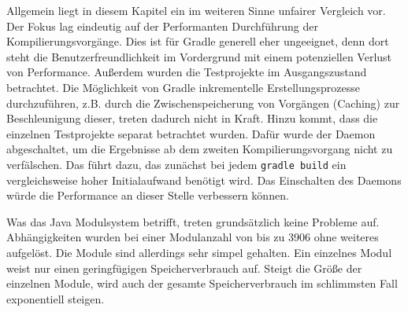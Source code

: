 Allgemein liegt in diesem Kapitel ein im weiteren Sinne unfairer Vergleich vor.
Der Fokus lag eindeutig auf der Performanten Durchführung der Kompilierungsvorgänge. Dies ist für Gradle generell eher ungeeignet, denn dort steht die Benutzerfreundlichkeit im Vordergrund mit einem potenziellen Verlust von Performance. 
Außerdem wurden die Testprojekte im Ausgangszustand betrachtet. Die Möglichkeit von Gradle inkrementelle Erstellungsprozesse durchzuführen, z.B. durch die Zwischenspeicherung von Vorgängen (Caching) zur Beschleunigung dieser, treten dadurch nicht in Kraft. 
Hinzu kommt, dass die einzelnen Testprojekte separat betrachtet wurden. Dafür wurde der Daemon abgeschaltet, um die Ergebnisse ab dem zweiten Kompilierungsvorgang nicht zu verfälschen. Das führt dazu, das zunächst bei jedem \texttt{gradle build} ein vergleichsweise hoher Initialaufwand benötigt wird. Das Einschalten des Daemons würde die Performance an dieser Stelle verbessern können.

Was das Java Modulsystem betrifft, treten grundsätzlich keine Probleme auf. Abhängigkeiten wurden bei einer Modulanzahl von bis zu 3906 ohne weiteres aufgelöst. Die Module sind allerdings sehr simpel gehalten. Ein einzelnes Modul weist nur einen geringfügigen Speicherverbrauch auf. Steigt die Größe der einzelnen Module, wird auch der gesamte Speicherverbrauch im schlimmsten Fall exponentiell steigen. \pagebreak

